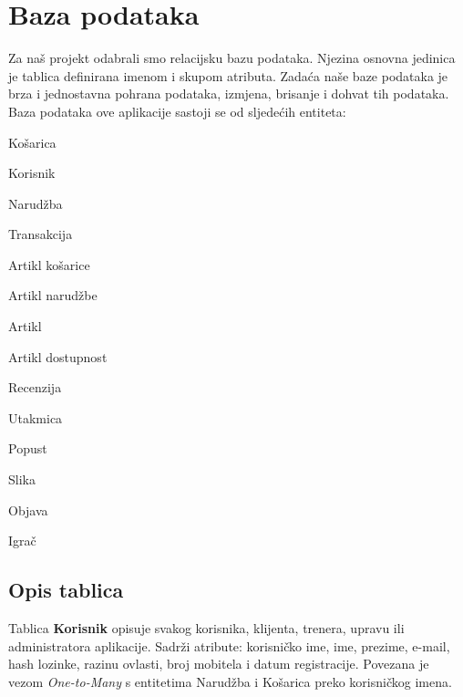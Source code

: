 	
		

		

				
		\section{Baza podataka}
			
			
		\textnormal{Za naš projekt odabrali smo relacijsku bazu podataka. Njezina osnovna jedinica je tablica definirana imenom i skupom atributa. Zadaća naše baze podataka je brza i jednostavna pohrana podataka, izmjena, brisanje i dohvat tih podataka. Baza podataka ove aplikacije sastoji se od sljedećih entiteta:}
		\smallbreak
			\begin{packed_item}
				\setlength\itemsep{0.01em}
			\item  Košarica
			\item  Korisnik
			\item  Narudžba
			\item Transakcija
			\item Artikl košarice
			\item Artikl narudžbe
			\item Artikl
			\item Artikl dostupnost
			\item Recenzija
			\item Utakmica
			\item Popust
			\item Slika
			\item Objava
			\item Igrač
		\end{packed_item}
		
		
			\subsection{Opis tablica}
			

				\textnormal{Tablica \textbf{Korisnik} opisuje svakog korisnika, klijenta, trenera, upravu ili administratora aplikacije. Sadrži atribute: korisničko ime, ime, prezime, e-mail, hash lozinke, razinu ovlasti, broj mobitela i datum registracije. Povezana je vezom \textit{One-to-Many}  s entitetima Narudžba i Košarica preko korisničkog imena. }
				
